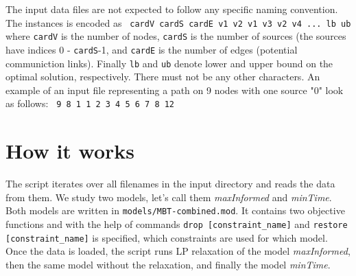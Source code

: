 \documentclass[12pt]{article}
\begin{document}
The input data files are not expected to follow any specific naming convention.
The instances is encoded as \newline\newline
\texttt{
cardV cardS cardE\newline
v1 v2\newline
v1 v3\newline
v2 v4\newline
...\newline
lb ub\newline\newline
}
where \texttt{cardV} is the number of nodes, \texttt{cardS} is the number of sources (the sources have indices 0 - \texttt{cardS}-1, 
and \texttt{cardE} is the number of edges (potential communiction links).
Finally \texttt{lb} and \texttt{ub} denote lower and upper bound on the optimal solution, respectively.
There must not be any other characters.
An example of an input file representing a path on 9 nodes with one source "0" look as follows:\newline\newline
\texttt{
9	8	1	1	2	3	4	5	6	7	8	12\newline\newline
}

\section{How it works}

The script iterates over all filenames in the input directory and reads the data from them.
We study two models, let's call them \emph{maxInformed} and \emph{minTime}.
Both models are written in \texttt{models/MBT-combined.mod}.
It contains two objective functions and with the help of commands \texttt{drop [constraint\_name]} and \texttt{restore [constraint\_name]} is specified, which constraints are used for which model. 
Once the data is loaded, the script runs LP relaxation of the model \emph{maxInformed}, then the same model without the relaxation, and finally the model \emph{minTime}.
\end{document}
